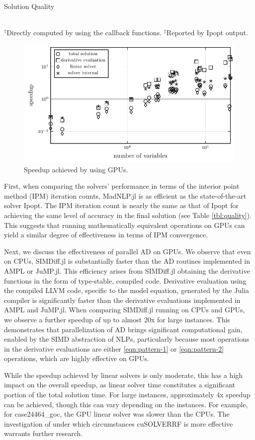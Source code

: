 \begin{table}[t]
  \scriptsize
  \centering
  \caption{Solution Quality}
  \label{tbl:quality}
  \\
  $^\dag$Directly computed by using the callback functions. $^\ddag$Reported by Ipopt output.
\end{table}
\begin{figure}[t]
  \includegraphics[width=.45\textwidth]{speedup-sol.pdf}
  \caption{Speedup achieved by using GPUs.}
  \label{fig:speedup}
\end{figure}


First, when comparing the solvers' performance in terms of the
interior point method (IPM) iteration counts, MadNLP.jl is as
efficient as the state-of-the-art solver Ipopt. The IPM iteration
count is nearly the same as that of Ipopt for achieving the same level
of accuracy in the final solution (see Table \ref{tbl:quality}). This
suggests that running mathematically equivalent operations on GPUs can
yield a similar degree of effectiveness in terms of IPM convergence.

Next, we discuss the effectiveness of parallel AD on GPUs. We observe that even on CPUs, SIMDiff.jl
is substantially faster than the AD routines
implemented in AMPL or JuMP.jl. This efficiency arises from SIMDiff.jl
obtaining the derivative functions in the form of type-stable,
compiled code. Derivative evaluation using the compiled LLVM
code, specific to the model equation, generated by the Julia compiler
is significantly faster than the
derivative evaluations implemented in AMPL and JuMP.jl. When comparing
SIMDiff.jl running on CPUs and GPUs, we observe a further speedup of
up to almost 20x for large instances. This demonstrates that
parallelization of AD brings significant computational gain, enabled
by the SIMD abstraction of NLPs, particularly because most operations
in the derivative evaluations are either \ref{eqn:pattern-1} or
\ref{eqn:pattern-2} operations, which are highly effective on GPUs.

While the speedup achieved by linear solvers is only moderate, this
has a high impact on the overall speedup, as linear solver time
constitutes a significant portion of the total solution time. For
large instances, approximately 4x speedup can be achieved, though this
can vary depending on the instances. For example, for case24464\_goc,
the GPU linear solver was slower than the CPUs. The investigation of
under which circumstances cuSOLVERRF is more effective warrants
further research.

